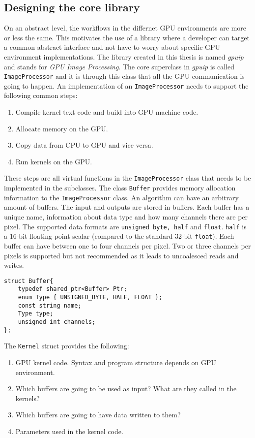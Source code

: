 \subsection {Designing the core library}

On an abstract level, the workflows in the differnet GPU environments are more or less the same. This motivates the use of a library where a developer can target a common abstract interface and not have to worry about specific GPU environment implementations. The library created in this thesis is named \emph{gpuip} and stands for \emph {GPU Image Processing}. The core superclass in \emph{gpuip} is called {\tt ImageProcessor} and it is through this class that all the GPU communication is going to happen. An implementation of an {\tt ImageProcessor} needs to support the following common steps:

\begin{enumerate}
\item Compile kernel text code and build into GPU machine code.
\item Allocate memory on the GPU.
\item Copy data from CPU to GPU and vice versa.
\item Run kernels on the GPU.
\end{enumerate}

These steps are all virtual functions in the {\tt ImageProcessor} class that needs to be implemented in the subclasses. The class {\tt Buffer} provides memory allocation information to the {\tt ImageProcessor} class. An algorithm can have an arbitrary amount of buffers. The input and outputs are stored in buffers. Each buffer has a unique name, information about data type and how many channels there are per pixel. The supported data formats are {\tt unsigned byte, half} and {\tt float}. {\tt half} is a 16-bit floating point scalar (compared to the standard 32-bit {\tt float}). Each buffer can have between one to four channels per pixel. Two or three channels per pixels is supported but not recommended as it leads to uncoalesced reads and writes\cite{cudaoptimize}. 
\newline
\renewcommand{\lstlistingname}{Code}
\begin{lstlisting}[caption= Buffer struct, label=bufferapi]
struct Buffer{
    typedef shared_ptr<Buffer> Ptr;
    enum Type { UNSIGNED_BYTE, HALF, FLOAT };
    const string name;
    Type type;
    unsigned int channels;
};
\end{lstlisting}
\newpage
The {\tt Kernel} struct provides the following:
\begin{enumerate}
\item GPU kernel code. Syntax and program structure depends on GPU environment.
\item Which buffers are going to be used as input? What are they called in the kernels?
\item Which buffers are going to have data written to them?
\item Parameters used in the kernel code.
\end{enumerate}

